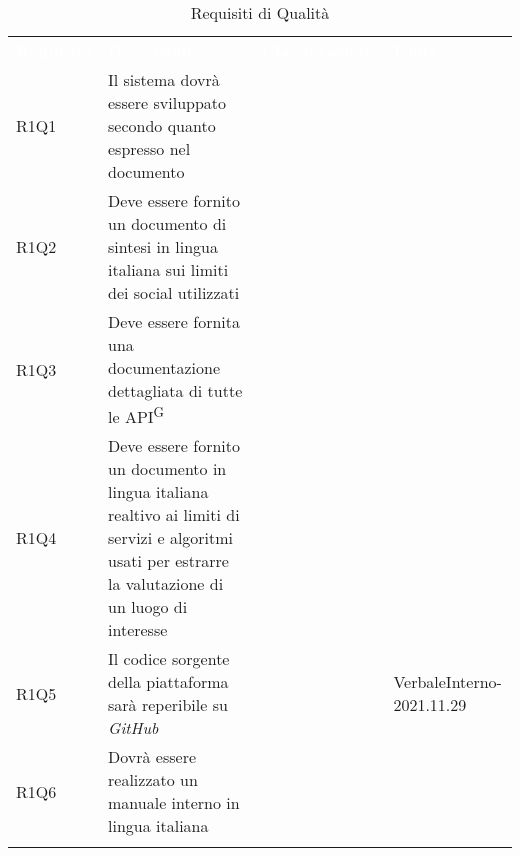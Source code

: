 

\renewcommand{\arraystretch}{1.5}
\begin{longtable}{ m{}<{\centering}  m{}<{\centering}  m{}<{\centering}  m{}<{\centering}}
	\rowcolor{darkblue}
	\textcolor{white}{\textbf{Requisito}} &\textcolor{white}{\textbf{Descrizione}}& \textcolor{white}{\textbf{Classificazione}} & \textcolor{white}{\textbf{Fonti}}\\ 

	R1Q1 & Il sistema dovrà essere sviluppato secondo quanto espresso nel documento \textit{\NdP} & \Ob & \Di \\
	
	R1Q2 & Deve essere fornito un documento di sintesi in lingua italiana sui limiti dei social utilizzati & \Ob & \Ca \\
	
	R1Q3 & Deve essere fornita una documentazione dettagliata di tutte le API\textsuperscript{G} & \Ob & \Ca \\

	R1Q4 & Deve essere fornito un documento in lingua italiana realtivo ai limiti di servizi e algoritmi usati per estrarre la valutazione di un luogo di interesse & \Ob & \Ca \\

	R1Q5 & Il codice sorgente della piattaforma sarà reperibile su \textit{GitHub} & \Ob & VerbaleInterno-2021.11.29 \\
	
	R1Q6 & Dovrà essere realizzato un manuale interno in lingua italiana  & \Ob & \Di \\

	\hiderowcolors \caption{Requisiti di Qualità}
\end{longtable}

\clearpage